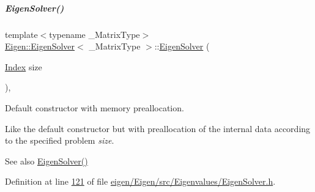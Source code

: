 \mbox{\label{group___eigenvalues___module_aa4edf56ecc178b277b75c13a2ca1089f}} 
\subparagraph{\texorpdfstring{Eigen\+Solver()}{EigenSolver()}\hspace{0.1cm}{\footnotesize\ttfamily [2/6]}}
{\footnotesize\ttfamily template$<$typename \+\_\+\+Matrix\+Type$>$ \\
\hyperlink{group___eigenvalues___module_class_eigen_1_1_eigen_solver}{Eigen\+::\+Eigen\+Solver}$<$ \+\_\+\+Matrix\+Type $>$\+::\hyperlink{group___eigenvalues___module_class_eigen_1_1_eigen_solver}{Eigen\+Solver} (\begin{DoxyParamCaption}\item[{\hyperlink{group___eigenvalues___module_a5bff6a6bc0efac67d52c60c2c3deb9ee}{Index}}]{size }\end{DoxyParamCaption})\hspace{0.3cm}{\ttfamily [inline]}, {\ttfamily [explicit]}}



Default constructor with memory preallocation. 

Like the default constructor but with preallocation of the internal data according to the specified problem {\itshape size}. \begin{DoxySeeAlso}{See also}
\hyperlink{group___eigenvalues___module_a3af22d721a6401365881b2ef252d26aa}{Eigen\+Solver()} 
\end{DoxySeeAlso}


Definition at line \hyperlink{eigen_2_eigen_2src_2_eigenvalues_2_eigen_solver_8h_source_l00121}{121} of file \hyperlink{eigen_2_eigen_2src_2_eigenvalues_2_eigen_solver_8h_source}{eigen/\+Eigen/src/\+Eigenvalues/\+Eigen\+Solver.\+h}.

